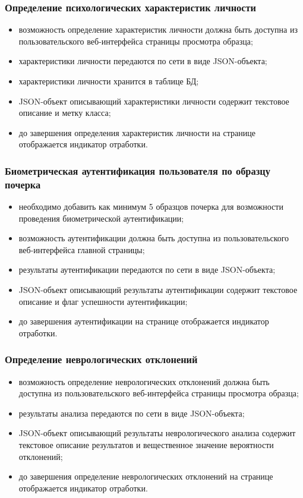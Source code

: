 \subsubsection{Определение психологических характеристик личности}
\label{sec:freq:psiho_analysis}
\begin{itemize}
	\item возможность определение характеристик личности должна быть доступна из пользовательского веб-интерфейса страницы просмотра образца;
	\item характеристики личности передаются по сети в виде JSON-объекта;
	\item характеристики личности хранится в таблице БД;
	\item JSON-объект описывающий характеристики личности содержит текстовое описание и метку класса;
	\item до завершения определения характеристик личности на странице отображается индикатор отработки.
\end{itemize}

\subsubsection{Биометрическая аутентификация пользователя по образцу почерка}
\label{sec:freq:bio_identification}
\begin{itemize}
	\item необходимо добавить как минимум 5 образцов почерка для возможности проведения биометрической аутентификации;
	\item возможность аутентификации должна быть доступна из пользовательского веб-интерфейса главной страницы;
	\item результаты аутентификации передаются по сети в виде JSON-объекта;
	\item JSON-объект описывающий результаты аутентификации содержит текстовое описание и флаг успешности аутентификации;
	\item до завершения аутентификации на странице отображается индикатор отработки.
\end{itemize}

\subsubsection{Определение неврологических отклонений}
\label{sec:freq:neuro_analysis}
\begin{itemize}
	\item возможность определение неврологических отклонений должна быть доступна из пользовательского веб-интерфейса страницы просмотра образца;
	\item результаты анализа передаются по сети в виде JSON-объекта;
	\item JSON-объект описывающий результаты неврологического анализа содержит текстовое описание результатов и вещественное значение вероятности отклонений;
	\item до завершения определение неврологических отклонений на странице отображается индикатор отработки.
\end{itemize}

